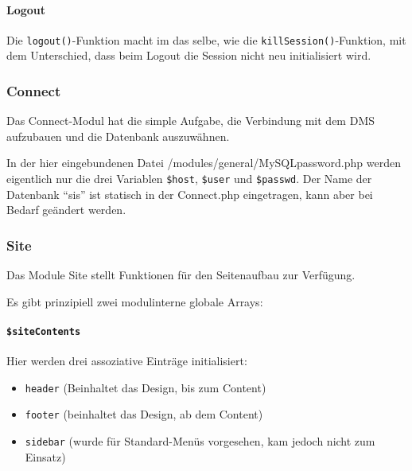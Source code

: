 \paragraph{Logout\\}
Die \texttt{logout()}-Funktion macht im das selbe, wie die \texttt{killSession()}-Funktion, mit dem Unterschied, dass beim Logout die Session nicht neu initialisiert wird.


\subsubsection{Connect}
\label{sec:content_imple_base_connect}
Das Connect-Modul hat die simple Aufgabe, die Verbindung mit dem DMS aufzubauen und die Datenbank auszuwähnen.

In der hier eingebundenen Datei /modules/general/MySQLpassword.php werden eigentlich nur die drei Variablen \texttt{\$host}, \texttt{\$user} und \texttt{\$passwd}. Der Name der Datenbank \enquote{sis} ist statisch in der Connect.php eingetragen, kann aber bei Bedarf geändert werden.

\subsubsection{Site}
Das Module Site stellt Funktionen für den Seitenaufbau zur Verfügung.

Es gibt prinzipiell zwei modulinterne globale Arrays:
\paragraph{\texttt{\$siteContents}\\}
Hier werden drei assoziative Einträge initialisiert: 
\begin{itemize}
	\item \texttt{header} (Beinhaltet das Design, bis zum Content)
	\item \texttt{footer} (beinhaltet das Design, ab dem Content)
	\item \texttt{sidebar} (wurde für Standard-Menüs vorgesehen, kam jedoch nicht zum Einsatz)
\end{itemize}
